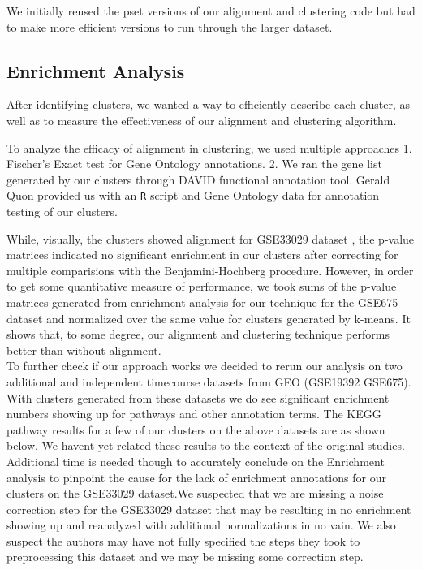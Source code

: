 \documentclass[aps,prd,final,onecolumn,a4paper,10pt]{revtex4}
\begin{document}
We initially reused the pset versions of our alignment and clustering code but had to make more efficient versions to run through the larger dataset.

\subsection{Enrichment Analysis}
After identifying clusters, we wanted a way to efficiently describe each cluster, as well as to measure the effectiveness of our alignment and clustering algorithm.

To analyze the efficacy of alignment in clustering, we used multiple approaches 1. Fischer's Exact test for Gene Ontology annotations. 2. We ran the gene list generated by our clusters through DAVID functional annotation tool.
Gerald Quon provided us with an \verb!R! script and Gene Ontology data for annotation testing of our clusters.

While, visually, the clusters showed alignment for GSE33029 dataset , the p-value matrices indicated no significant enrichment in our clusters after correcting for multiple comparisions with the Benjamini-Hochberg procedure. However, in order to get some quantitative measure of performance, we took sums of the p-value matrices generated from enrichment analysis for our technique for the GSE675 dataset and normalized over the same value for clusters generated by k-means. It shows that, to some degree, our alignment and clustering technique performs better than without alignment.\\

To further check if our approach works we decided to rerun our analysis on two additional and independent timecourse datasets from GEO (GSE19392 GSE675). With clusters generated from these datasets we do see significant enrichment numbers showing up for pathways and other annotation terms. The KEGG pathway results for a few of our clusters on the above datasets are as shown below. We havent yet related these results to the context of the original studies. Additional time is needed though to accurately conclude on the Enrichment analysis to pinpoint the cause for the lack of enrichment annotations for our clusters on the GSE33029 dataset.We suspected that we are missing a noise correction step for the GSE33029 dataset that may be resulting in no enrichment showing up and reanalyzed with additional normalizations in no vain. We also suspect the authors may have not fully specified the steps they took to preprocessing this dataset and we may be missing some correction step.
\end{document}
